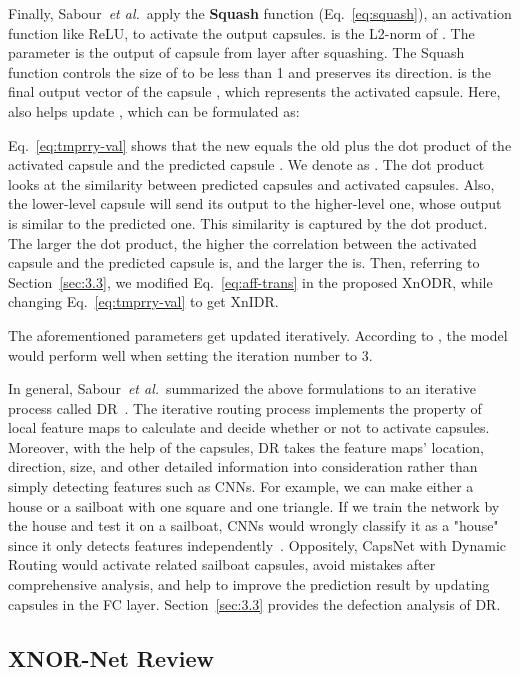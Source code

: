 \documentclass[sn-mathphys,iicol,Numbered]{sn-jnl}
\newcommand{\etal}{\textit{et al.}}
\begin{document}
Finally, Sabour~\etal~apply the \textbf{Squash} function (Eq.~\ref{eq:squash}), an activation function like ReLU, to activate the output capsules.  is the L2-norm of . The parameter  is the output of capsule  from layer  after squashing. The Squash function controls the size of  to be less than 1 and preserves its direction.  is the final output vector of the capsule , which represents the activated capsule. Here,  also helps update , which can be formulated as:



Eq.~\ref{eq:tmprry-val} shows that the new  equals the old  plus the dot product of the activated capsule  and the predicted capsule . We denote  as . The dot product looks at the similarity between predicted capsules and activated capsules. Also, the lower-level capsule will send its output to the higher-level one, whose output is similar to the predicted one. This similarity is captured by the dot product. The larger the dot product, the higher the correlation between the activated capsule and the predicted capsule is, and the larger the  is. Then, referring to Section~\ref{sec:3.3}, we modified Eq.~\ref{eq:aff-trans} in the proposed XnODR, while changing Eq.~\ref{eq:tmprry-val} to get XnIDR.

The aforementioned parameters get updated iteratively. According to \cite{A1_caps}, the model would perform well when setting the iteration number to 3.

In general, Sabour~\etal~summarized the above formulations to an iterative process called DR~\citep{A1_caps}. The iterative routing process implements the property of local feature maps to calculate and decide whether or not to activate capsules. Moreover, with the help of the capsules, DR takes the feature maps' location, direction, size, and other detailed information into consideration rather than simply detecting features such as CNNs. For example, we can make either a house or a sailboat with one square and one triangle. If we train the network by the house and test it on a sailboat, CNNs would wrongly classify it as a "house" since it only detects features independently~\cite{A65_Boat_House}. Oppositely, CapsNet with Dynamic Routing would activate related sailboat capsules, avoid mistakes after comprehensive analysis, and help to improve the prediction result by updating capsules in the FC layer. Section~\ref{sec:3.3} provides the defection analysis of DR.

\subsection{XNOR-Net Review} \label{sec:3.2}
 
\end{document}
